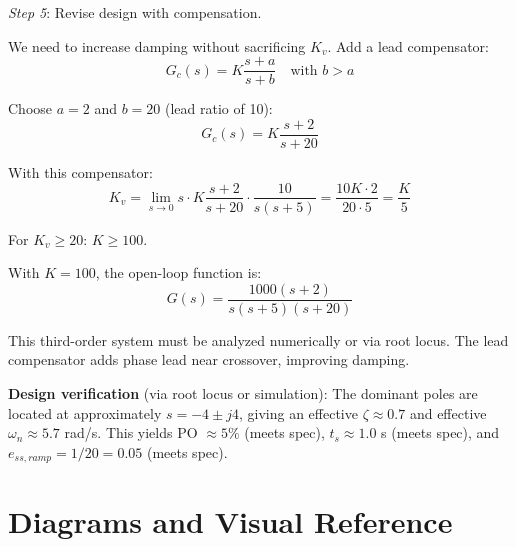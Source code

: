 \begin{examplebox}
\textit{Step 5}: Revise design with compensation.

We need to increase damping without sacrificing $K_v$. Add a lead compensator:
\begin{equation}
    G_c(s) = K\frac{s+a}{s+b} \quad \text{with } b > a
\end{equation}

Choose $a = 2$ and $b = 20$ (lead ratio of 10):
\begin{equation}
    G_c(s) = K\frac{s+2}{s+20}
\end{equation}

With this compensator:
\begin{equation}
    K_v = \lim_{s\to 0} s \cdot K\frac{s+2}{s+20} \cdot \frac{10}{s(s+5)} = \frac{10K \cdot 2}{20 \cdot 5} = \frac{K}{5}
\end{equation}

For $K_v \geq 20$: $K \geq 100$.

With $K = 100$, the open-loop function is:
\begin{equation}
    G(s) = \frac{1000(s+2)}{s(s+5)(s+20)}
\end{equation}

This third-order system must be analyzed numerically or via root locus. The lead compensator adds phase lead near crossover, improving damping.

\textbf{Design verification} (via root locus or simulation): The dominant poles are located at approximately $s = -4 \pm j4$, giving an effective $\zeta \approx 0.7$ and effective $\omega_n \approx 5.7$ rad/s. This yields PO $\approx 5\%$ (meets spec), $t_s \approx 1.0$ s (meets spec), and $e_{ss,ramp} = 1/20 = 0.05$ (meets spec).
\end{examplebox}

\section{Diagrams and Visual Reference}

